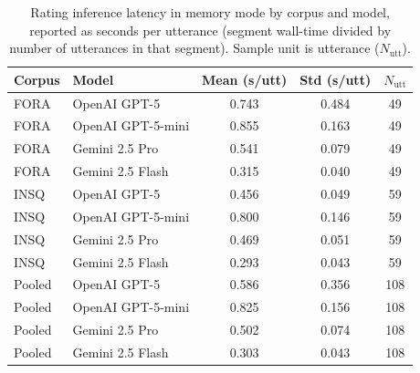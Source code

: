 \begin{table}[t]
\centering
\caption{Rating inference latency in memory mode by corpus and model, reported as seconds per utterance (segment wall-time divided by number of utterances in that segment). Sample unit is utterance (\(N_{\text{utt}}\)).}
\label{tab:rating_latency}
\begin{tabular}{l l c c c}
\hline
Corpus & Model & Mean (s/utt) & Std (s/utt) & \(N_{\text{utt}}\) \\
\hline
FORA & OpenAI GPT-5 & 0.743 & 0.484 & 49 \\
FORA & OpenAI GPT-5-mini & 0.855 & 0.163 & 49 \\
FORA & Gemini 2.5 Pro & 0.541 & 0.079 & 49 \\
FORA & Gemini 2.5 Flash & 0.315 & 0.040 & 49 \\
INSQ & OpenAI GPT-5 & 0.456 & 0.049 & 59 \\
INSQ & OpenAI GPT-5-mini & 0.800 & 0.146 & 59 \\
INSQ & Gemini 2.5 Pro & 0.469 & 0.051 & 59 \\
INSQ & Gemini 2.5 Flash & 0.293 & 0.043 & 59 \\
Pooled & OpenAI GPT-5 & 0.586 & 0.356 & 108 \\
Pooled & OpenAI GPT-5-mini & 0.825 & 0.156 & 108 \\
Pooled & Gemini 2.5 Pro & 0.502 & 0.074 & 108 \\
Pooled & Gemini 2.5 Flash & 0.303 & 0.043 & 108 \\
\hline
\end{tabular}
\end{table}
